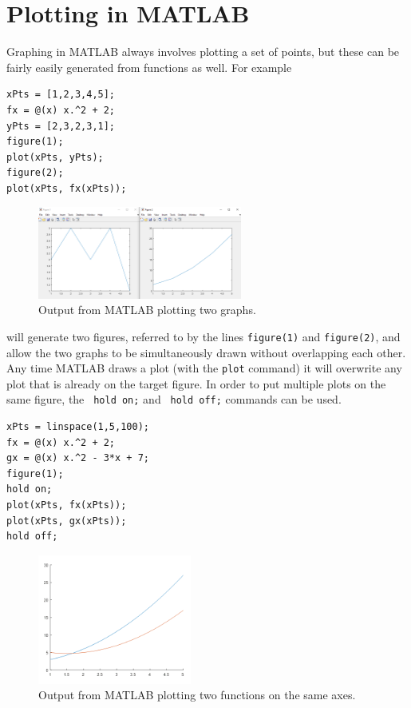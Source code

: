 \documentclass{ximera}
\begin{document}
\section{Plotting in MATLAB}

Graphing in MATLAB always involves plotting a set of points, but these can be fairly easily generated from functions as well. For example
\begin{verbatim}
xPts = [1,2,3,4,5];
fx = @(x) x.^2 + 2;
yPts = [2,3,2,3,1];
figure(1);
plot(xPts, yPts);
figure(2);
plot(xPts, fx(xPts));
\end{verbatim}

\begin{figure}[h!]
    \centering
    \includegraphics[width=0.6\textwidth]{figures/MatlabDemo_plotTest.png}
    \caption{Output from MATLAB plotting two graphs.}
    \label{fig:MatlabDemo_PlotTest}
\end{figure}


will generate two figures, referred to by the lines \texttt{figure(1)} and \texttt{figure(2)}, and allow the two graphs to be simultaneously drawn without overlapping each other. Any time MATLAB draws a plot (with the \texttt{plot} command) it will overwrite any plot that is already on the target figure. In order to put multiple plots on the same figure, the \texttt{ hold on;} and \texttt{ hold off;} commands can be used. 

\begin{verbatim}
xPts = linspace(1,5,100);
fx = @(x) x.^2 + 2;
gx = @(x) x.^2 - 3*x + 7;
figure(1);
hold on;
plot(xPts, fx(xPts));
plot(xPts, gx(xPts));
hold off;
\end{verbatim}

\begin{figure}[h!]
    \centering
    \includegraphics[width=0.45\textwidth]{figures/MatlabDemo_funGraph.png}
    \caption{Output from MATLAB plotting two functions on the same axes.}
    \label{fig:MatlabDemo_FunGraph}
\end{figure}
\end{document}
